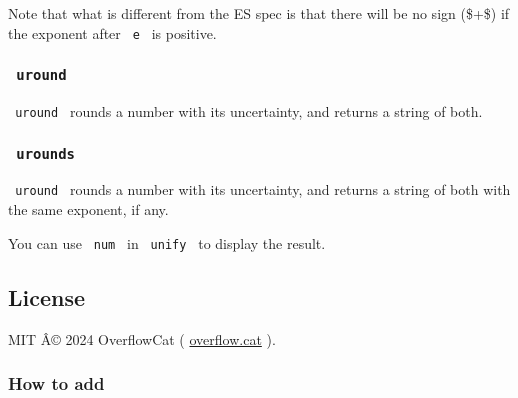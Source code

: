 \begin{Shaded}
\begin{Highlighting}[]
\end{Highlighting}
\end{Shaded}

Note that what is different from the ES spec is that there will be no
sign (\$+\$) if the exponent after \texttt{\ e\ } is positive.

\subsubsection{\texorpdfstring{\texttt{\ uround\ }}{ uround }}\label{uround}

\texttt{\ uround\ } rounds a number with its uncertainty, and returns a
string of both.

\begin{Shaded}
\begin{Highlighting}[]
\end{Highlighting}
\end{Shaded}

\subsubsection{\texorpdfstring{\texttt{\ urounds\ }}{ urounds }}\label{urounds}

\texttt{\ uround\ } rounds a number with its uncertainty, and returns a
string of both with the same exponent, if any.

You can use \texttt{\ num\ } in \texttt{\ unify\ } to display the
result.

\subsection{License}\label{license}

MIT Â© 2024 OverflowCat (
\href{https://about.overflow.cat/}{overflow.cat} ).

\subsubsection{How to add}\label{how-to-add}

